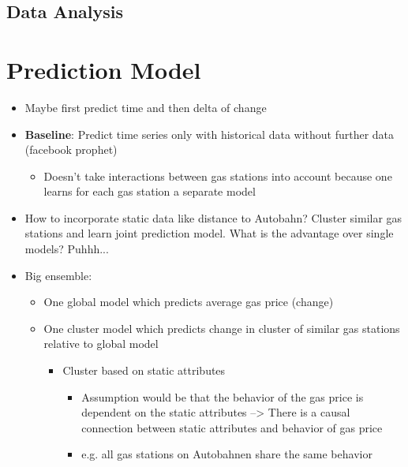 \documentclass[%
a4paper,
DIV12,
2.5headlines,
bigheadings,
titlepage,
openbib,
]{scrartcl}
\begin{document}
\subsection{Data Analysis}\label{data-analysis}



\section{Prediction Model}\label{prediction-model}
\begin{itemize}
\item Maybe first predict time and then delta of change\\
\item \textbf{Baseline}: Predict time series only with historical data without further data (facebook prophet)\\

\begin{itemize}
\item Doesn't take interactions between gas stations into account because one learns for each gas station a separate model
\end{itemize}
		
\item How to incorporate static data like distance to Autobahn? Cluster similar gas stations and learn joint prediction model. 
What is the advantage over single models? Puhhh...\\
\item Big ensemble:

\begin{itemize}
\item One global model which predicts average gas price (change)
\item One cluster model which predicts change in cluster of similar gas stations relative to global model

\begin{itemize}
\item Cluster based on static attributes

\begin{itemize}
\item Assumption would be that the behavior of the gas price is dependent on the static attributes --> There is a causal connection between static attributes and behavior of gas price
\item e.g. all gas stations on Autobahnen share the same behavior
\end{itemize}


\end{itemize}
\end{itemize}
\end{itemize}
\end{document}

